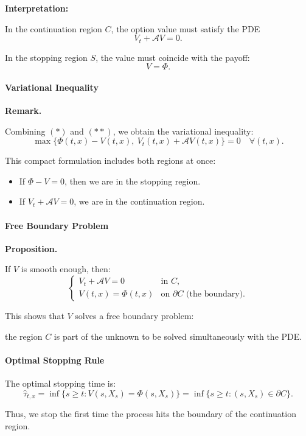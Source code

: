 \documentclass[12pt,a4paper]{article}
\theoremstyle{definition}
\begin{document}
\textbf{Interpretation:}

In the continuation region $C$, the option value must satisfy the PDE
\[
V_t + \mathcal{A}V = 0.
\]

In the stopping region $S$, the value must coincide with the payoff:
\[
V = \Phi.
\]

\paragraph{Variational Inequality}

\textbf{Remark.}

Combining $(*)$ and $(**)$, we obtain the variational inequality:
\[
\max\{\Phi(t, x) - V(t, x), \ V_t(t, x) + \mathcal{A}V(t, x)\} = 0 \quad \forall (t, x).
\]

This compact formulation includes both regions at once:

\begin{itemize}
\item If $\Phi - V = 0$, then we are in the stopping region.

\item If $V_t + \mathcal{A}V = 0$, we are in the continuation region.
\end{itemize}

\paragraph{Free Boundary Problem}

\textbf{Proposition.}

If $V$ is smooth enough, then:
\[
\begin{cases}
V_t + \mathcal{A}V = 0 & \text{in } C, \\
V(t, x) = \Phi(t, x) & \text{on } \partial C \text{ (the boundary)}.
\end{cases}
\]

This shows that $V$ solves a free boundary problem:

the region $C$ is part of the unknown to be solved simultaneously with the PDE.

\paragraph{Optimal Stopping Rule}

The optimal stopping time is:
\[
\hat{\tau}_{t,x} = \inf\{s \geq t : V(s, X_s) = \Phi(s, X_s)\} = \inf\{s \geq t : (s, X_s) \in \partial C\}.
\]

Thus, we stop the first time the process hits the boundary of the continuation region.
\end{document}
